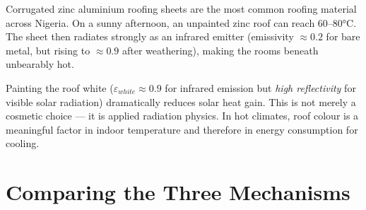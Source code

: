 \begin{diagbox}
\begin{center}
\end{center}
\end{diagbox}

\begin{realworldbox}
Corrugated zinc aluminium roofing sheets are the most
common roofing material across Nigeria. On a sunny
afternoon, an unpainted zinc roof can reach
$60$--$80°\text{C}$. The sheet then radiates strongly
as an infrared emitter (emissivity $\approx 0.2$ for
bare metal, but rising to $\approx 0.9$ after weathering),
making the rooms beneath unbearably hot.

Painting the roof white ($\varepsilon_{white}
\approx 0.9$ for infrared emission but \textit{high
reflectivity} for visible solar radiation) dramatically
reduces solar heat gain. This is not merely a
cosmetic choice --- it is applied radiation physics.
In hot climates, roof colour is a meaningful factor
in indoor temperature and therefore in energy
consumption for cooling.
\end{realworldbox}

\section{Comparing the Three Mechanisms}

